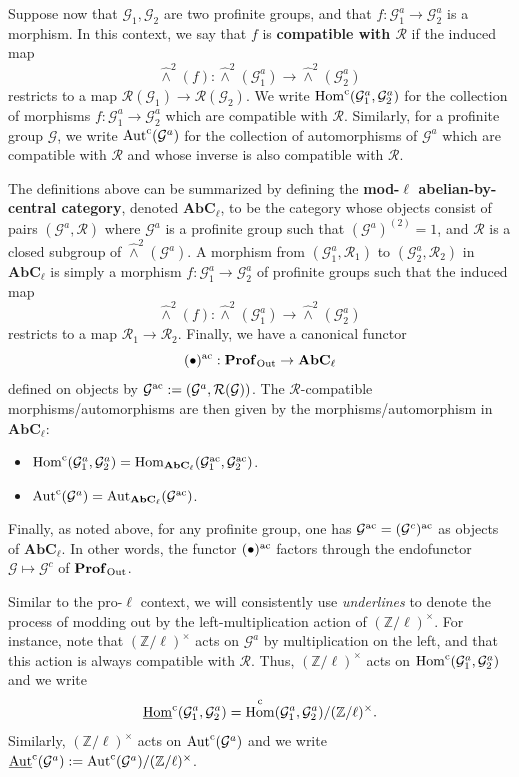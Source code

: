 \documentclass[11pt]{amsart}
\theoremstyle{definition}
\theoremstyle{remark}
\numberwithin{equation}{section}
\DeclareMathOperator{\Aut}{Aut}
\DeclareMathOperator{\Hom}{Hom}
\newcommand{\Z}{\mathbb{Z}}
\newcommand{\Gc}{\mathcal{G}}
\newcommand{\Rcal}{\mathcal{R}}
\newcommand{\Autc}{\Aut^{\rm c}}
\newcommand{\UAutc}{\underline{\Aut}^{\rm c}}
\newcommand{\Profinite}{{\mathbf{Prof}_{\rm Out}}}
\newcommand{\Homc}{\Hom^{\rm c}}
\newcommand{\UHomc}{\underline{\Hom}^{\rm c}}
\newcommand{\AbC}{\mathbf{AbC}_{\ell}}
\newcommand{\ac}{{\rm ac}}
\begin{document}
Suppose now that $\Gc_1,\Gc_2$ are two profinite groups, and that $f : \Gc_1^a \rightarrow \Gc_2^a$ is a morphism.
In this context, we say that $f$ is {\bf compatible with $\Rcal$} if the induced map 
\[ \widehat\wedge^2 (f) : \widehat\wedge^2(\Gc_1^a) \rightarrow \widehat\wedge^2(\Gc_2^a) \]
restricts to a map $\Rcal(\Gc_1) \rightarrow \Rcal(\Gc_2)$.
We write $\Homc(\Gc_1^a,\Gc_2^a)$ for the collection of morphisms $f : \Gc_1^a \rightarrow \Gc_2^a$ which are compatible with $\Rcal$.
Similarly, for a profinite group $\Gc$, we write $\Autc(\Gc^a)$ for the collection of automorphisms of $\Gc^a$ which are compatible with $\Rcal$ and whose inverse is also compatible with $\Rcal$.

The definitions above can be summarized by defining the {\bf mod-$\ell$ abelian-by-central category}, denoted $\AbC$, to be the category whose objects consist of pairs $(\Gc^a,\Rcal)$ where $\Gc^a$ is a profinite group such that $(\Gc^a)^{(2)} = 1$, and $\Rcal$ is a closed subgroup of $\widehat\wedge^2(\Gc^a)$.
A morphism from $(\Gc_1^a,\Rcal_1)$ to $(\Gc_2^a,\Rcal_2)$ in $\AbC$ is simply a morphism $f : \Gc_1^a \rightarrow \Gc_2^a$ of profinite groups such that the induced map 
\[ \widehat\wedge^2 (f) : \widehat\wedge^2(\Gc_1^a) \rightarrow \widehat\wedge^2(\Gc_2^a) \]
restricts to a map $\Rcal_1 \rightarrow \Rcal_2$.
Finally, we have a canonical functor 
\[ (\bullet)^\ac : \Profinite \rightarrow \AbC \]
defined on objects by $\Gc^\ac := (\Gc^a,\Rcal(\Gc))$.
The $\Rcal$-compatible morphisms/automorphisms are then given by the morphisms/automorphism in $\AbC$:
\begin{itemize}
  \item $\Homc(\Gc_1^a,\Gc_2^a) = \Hom_{\AbC}(\Gc_1^\ac,\Gc_2^\ac)$.
  \item $\Autc(\Gc^a) = \Aut_{\AbC}(\Gc^\ac)$.
\end{itemize}
Finally, as noted above, for any profinite group, one has $\Gc^\ac = (\Gc^c)^\ac$ as objects of $\AbC$.
In other words, the functor $(\bullet)^\ac$ factors through the endofunctor $\Gc \mapsto \Gc^c$ of $\Profinite$.

Similar to the pro-$\ell$ context, we will consistently use \emph{underlines} to denote the process of modding out by the left-multiplication action of $(\Z/\ell)^\times$.
For instance, note that $(\Z/\ell)^\times$ acts on $\Gc^a$ by multiplication on the left, and that this action is always compatible with $\Rcal$.
Thus, $(\Z/\ell)^\times$ acts on $\Homc(\Gc_1^a,\Gc_2^a)$ and we write
\[ \UHomc(\Gc_1^a,\Gc_2^a) = \Homc(\Gc_1^a,\Gc_2^a)/(\Z/\ell)^\times. \]
Similarly, $(\Z/\ell)^\times$ acts on $\Autc(\Gc^a)$ and we write $\UAutc(\Gc^a) := \Autc(\Gc^a)/(\Z/\ell)^\times$.
\end{document}
